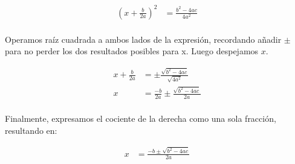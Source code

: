 \begin{align*}
	\left(x + \frac{b}{2a}\right)^2 & = \frac{b^2 - 4ac}{4a^2} \\
\end{align*}

Operamos raíz cuadrada a ambos lados de la expresión, recordando añadir $\pm$ para no perder los dos resultados posibles para x. Luego despejamos $x$.

\begin{align*}
	x + \frac{b}{2a} & = \pm \frac{\sqrt{b^2 - 4ac}}{\sqrt{4a^2}}      \\
	x                & = \frac{-b}{2a} \pm \frac{\sqrt{b^2 - 4ac}}{2a} \\
\end{align*}

Finalmente, expresamos el cociente de la derecha como una sola fracción, resultando en:

\begin{align*}
	x & = \frac{-b \pm \sqrt{b^2 - 4ac}}{2a} \\
\end{align*}

